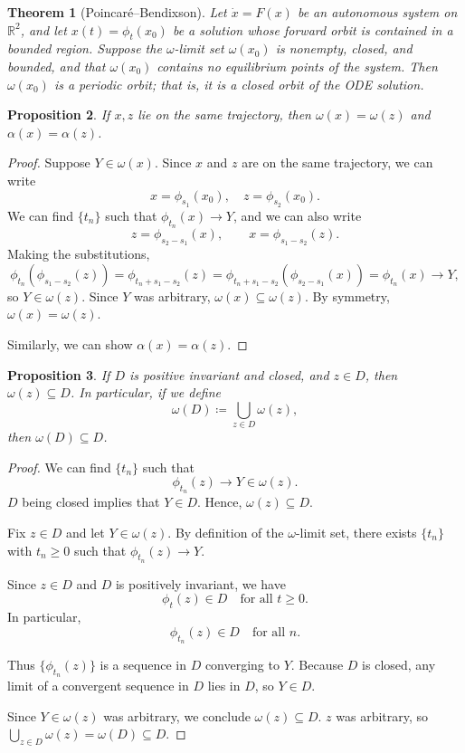 \documentclass{tufte-handout}
\newcommand*\R{\mathbb{R}}
\newtheorem{thm}{Theorem}[subsection]
\newtheorem{prop}[thm]{Proposition}
\theoremstyle{definition}
\begin{document}
\begin{thm}[Poincar\'e--Bendixson]
	Let $\dot x = F(x)$ be an autonomous system on $\R^2$, and let $x(t) = \phi_t(x_0)$ be a solution whose forward orbit is contained in a bounded region. Suppose the $\omega$-limit set $\omega(x_0)$ is nonempty, closed, and bounded, and that $\omega(x_0)$ contains no equilibrium points of the system. Then $\omega(x_0)$ is a periodic orbit; that is, it is a closed orbit of the ODE solution.
\end{thm}

\begin{prop}
	If $x,z$ lie on the same trajectory, then $\omega(x) = \omega(z)$ and $\alpha(x) = \alpha(z)$.
\end{prop}
\begin{proof}
	Suppose $Y \in \omega(x)$. Since $x$ and $z$ are on the same trajectory, we can write \[
		x = \phi_{s_1}(x_0), \quad z = \phi_{s_2}(x_0)
	.\] 
	We can find $\{t_n\}$ such that $\phi_{t_n}(x) \to Y$, and we can also write \[
		z = \phi_{s_2-s_1}(x), \qquad x = \phi_{s_1-s_2}(z)
	.\] Making the substitutions, \[
		\phi_{t_n}\left( \phi_{s_1-s_2}(z) \right) = \phi_{t_n + s_1-s_2}(z)  = \phi_{t_n + s_1 - s_2}\left( \phi_{s_2-s_1}(x)	 \right) = \phi_{t_n} (x) \to Y
	,\]  so $Y \in \omega(z)$. Since $Y$ was arbitrary, $\omega(x) \subseteq \omega(z)$. By symmetry, $\omega(x) = \omega(z)$.

	Similarly, we can show $\alpha(x) = \alpha(z)$.
\end{proof}

\begin{prop}
	If $D$ is positive invariant and closed, and $z \in D$, then $\omega(z) \subseteq D$. In particular, if we define
\[
  \omega(D) \coloneqq \bigcup_{z \in D} \omega(z),
\]
then $\omega(D) \subseteq D$.\end{prop}
\begin{proof}
	We can find $\{t_n\}$ such that \[
		\phi_{t_n}(z) \to Y \in \omega(z)
	.\] 
	$D$ being closed implies that $Y \in D$. Hence, $\omega(z) \subseteq D$.

	Fix $z \in D$ and let $Y \in \omega(z)$. By definition of the $\omega$-limit set, there exists
	$\{t_n\}$ with $t_n \ge 0$ such that $\phi_{t_n}(z) \to Y$.

	Since $z \in D$ and $D$ is positively invariant, we have
	\[
	  \phi_t(z) \in D \quad \text{for all } t \ge 0.
	\]
	In particular,
	\[
	  \phi_{t_n}(z) \in D \quad \text{for all } n.
	\]

	Thus $\{\phi_{t_n}(z)\}$ is a sequence in $D$ converging to $Y$. Because
	$D$ is closed, any limit of a convergent sequence in $D$ lies in $D$, so
	$Y \in D$.

	Since $Y \in \omega(z)$ was arbitrary, we conclude $\omega(z) \subseteq D$. $z$ was arbitrary, so $\bigcup\limits_{z \in D}^{} \omega(z) = \omega(D) \subseteq D$.
\end{proof}
\end{document}
